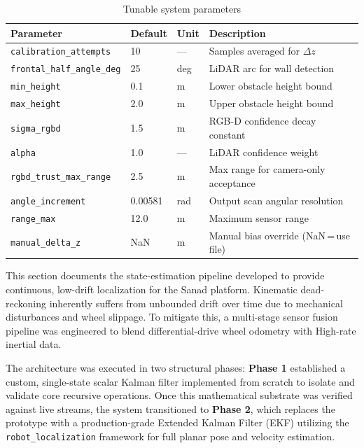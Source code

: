 \begin{table}[H]
\centering
\caption{Tunable system parameters}
\label{tab:params}
\begin{tabular}{llll}
\hline
\textbf{Parameter} & \textbf{Default} & \textbf{Unit}
                   & \textbf{Description} \\
\hline
\texttt{calibration\_attempts}  & 10      & —   & Samples averaged for $\Delta z$ \\
\texttt{frontal\_half\_angle\_deg} & 25   & deg & LiDAR arc for wall detection \\
\texttt{min\_height}            & 0.1     & m   & Lower obstacle height bound \\
\texttt{max\_height}            & 2.0     & m   & Upper obstacle height bound \\
\texttt{sigma\_rgbd}            & 1.5     & m   & RGB-D confidence decay constant \\
\texttt{alpha}                  & 1.0     & —   & LiDAR confidence weight \\
\texttt{rgbd\_trust\_max\_range}& 2.5     & m   & Max range for camera-only acceptance \\
\texttt{angle\_increment}       & 0.00581 & rad & Output scan angular resolution \\
\texttt{range\_max}             & 12.0    & m   & Maximum sensor range \\
\texttt{manual\_delta\_z}       & NaN     & m   & Manual bias override (NaN\,=\,use file) \\
\hline
\end{tabular}
\end{table}


\label{sec:odom_imu_fusion}

This section documents the state-estimation pipeline developed to provide continuous, low-drift localization for the Sanad platform. Kinematic dead-reckoning inherently suffers from unbounded drift over time due to mechanical disturbances and wheel slippage. To mitigate this, a multi-stage sensor fusion pipeline was engineered to blend differential-drive wheel odometry with High-rate inertial data. 

The architecture was executed in two structural phases: \textbf{Phase 1} established a custom, single-state scalar Kalman filter implemented from scratch to isolate and validate core recursive operations. Once this mathematical substrate was verified against live streams, the system transitioned to \textbf{Phase 2}, which replaces the prototype with a production-grade Extended Kalman Filter (EKF) utilizing the \texttt{robot\_localization} framework for full planar pose and velocity estimation.


